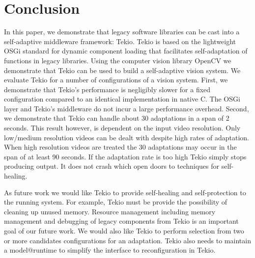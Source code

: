 \section{Conclusion}
\label{sec:conclusion}

In this paper, we demonstrate that legacy software libraries  can be cast into a self-adaptive middleware framework: Tekio. Tekio is based on the lightweight OSGi standard for dynamic component loading that facilitates self-adaptation of functions in legacy libraries. Using the computer vision library OpenCV we demonstrate that Tekio can be used to build a self-adaptive vision system. We evaluate Tekio for a number of configurations of a vision system. First, we demonstrate that Tekio's performance is negligibly slower for a fixed configuration compared to an identical implementation in native C. The OSGi layer and Tekio's middleware do not incur a large performance overhead. Second, we demonstrate that Tekio can handle about 30 adaptations in a span of 2 seconds. This result however, is dependent on the input video resolution. Only low/medium resolution videos can be dealt with despite high rates of adaptation. When high resolution videos are treated the 30 adaptations may occur in the span of at least 90 seconds. If the adaptation rate is too high Tekio simply stops producing output. It does not crash which open doors to techniques for self-healing.

As future work we would like Tekio  to provide self-healing and self-protection to the running system. For example, Tekio must be provide the possibility of cleaning up unused memory. Resource management including memory management and debugging of legacy components from Tekio is an important goal of our future work. We would also like Tekio to perform  selection from two or more  candidates configurations for an adaptation.  Tekio also needs to maintain a model@runtime to simplify the interface to reconfiguration in Tekio. 